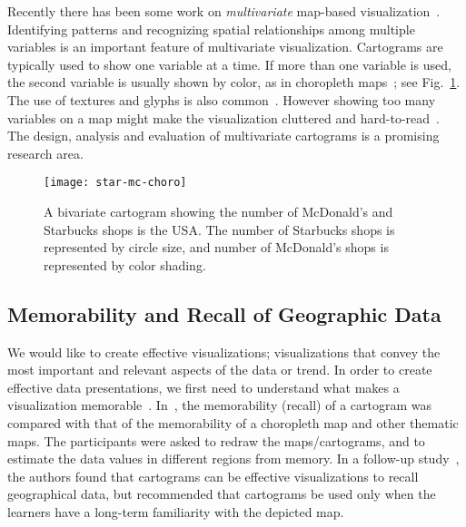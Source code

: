 \documentclass{egpubl}
\begin{document}
 Recently there has been some work on \textit{multivariate} map-based visualization~\cite{donnellan2004thematic,kaye2012mapping, FS04}. Identifying patterns and recognizing spatial relationships among multiple variables is an important feature of multivariate visualization. Cartograms are typically used to show one variable at a time. If more than one variable is used, the second variable is usually shown by color, as in choropleth maps~\cite{Bivar_book, bivar}; see Fig.~\ref{fig:choro}. The use of textures and glyphs is also common~\cite{carr1992hexagon, dorling1993computer, bivar2}. However showing too many variables on a map might make the visualization cluttered and hard-to-read~\cite{Bivar_book,kaye2012mapping}. The design, analysis and evaluation of multivariate cartograms is a promising research area.



\begin{figure}[htbp]
\begin{center}
\texttt{[image: star-mc-choro]}
\caption{A bivariate cartogram showing the number of McDonald's and Starbucks shops is the USA. The number of Starbucks shops is represented by circle size, and number of McDonald's shops is represented by color shading.}
\label{fig:choro}
\end{center}
\end{figure}







\subsection{Memorability and Recall of Geographic Data}

We would like to create effective visualizations; visualizations that convey the most important and relevant aspects of the data or trend. In order to create effective data presentations, we first need to understand what makes a visualization memorable~\cite{borkin2013makes}. In~\cite{rittschof1994comparing}, the memorability (recall) of a cartogram was compared with that of the memorability of a choropleth map and other thematic maps. The participants were asked to redraw the maps/cartograms, and to estimate the data values in different regions from memory. 
In a follow-up study~\cite{rittschof1996learning}, the authors found that 
cartograms can be effective visualizations to recall geographical data, but recommended that cartograms be used only when the learners have a long-term familiarity with the depicted map.
\end{document}
